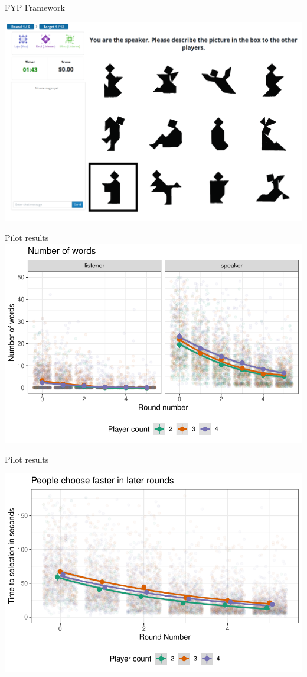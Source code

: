\documentclass[12pt, xcolor=beamer,table,usenames,dvipsnames, ignorenonframetext, ngerman,t]{beamer}
\begin{document}
\begin{frame}{FYP Framework}

 \includegraphics[width=.9\textwidth]{images/interface.PNG}
\end{frame}

\begin{frame}{Pilot results}
\includegraphics[width=\textwidth]{images/words.pdf}

\end{frame}

\begin{frame}{Pilot results}

	\includegraphics[width=\textwidth]{images/time.pdf}
	
\end{frame}
\end{document}
